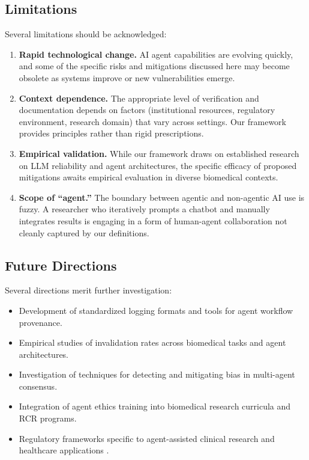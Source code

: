 \documentclass[11pt,letterpaper]{article}
\begin{document}
\subsection{Limitations}

Several limitations should be acknowledged:

\begin{enumerate}[leftmargin=*]
    \item \textbf{Rapid technological change.} AI agent capabilities are evolving quickly, and some of the specific risks and mitigations discussed here may become obsolete as systems improve or new vulnerabilities emerge.
    
    \item \textbf{Context dependence.} The appropriate level of verification and documentation depends on factors (institutional resources, regulatory environment, research domain) that vary across settings. Our framework provides principles rather than rigid prescriptions.
    
    \item \textbf{Empirical validation.} While our framework draws on established research on LLM reliability and agent architectures, the specific efficacy of proposed mitigations awaits empirical evaluation in diverse biomedical contexts.
    
    \item \textbf{Scope of ``agent.''} The boundary between agentic and non-agentic AI use is fuzzy. A researcher who iteratively prompts a chatbot and manually integrates results is engaging in a form of human-agent collaboration not cleanly captured by our definitions.
\end{enumerate}

\subsection{Future Directions}

Several directions merit further investigation:

\begin{itemize}[leftmargin=*]
    \item Development of standardized logging formats and tools for agent workflow provenance.
    \item Empirical studies of invalidation rates across biomedical tasks and agent architectures.
    \item Investigation of techniques for detecting and mitigating bias in multi-agent consensus.
    \item Integration of agent ethics training into biomedical research curricula and RCR programs.
    \item Regulatory frameworks specific to agent-assisted clinical research and healthcare applications \cite{fda_aiml,mesko2023}.
\end{itemize}
\end{document}
